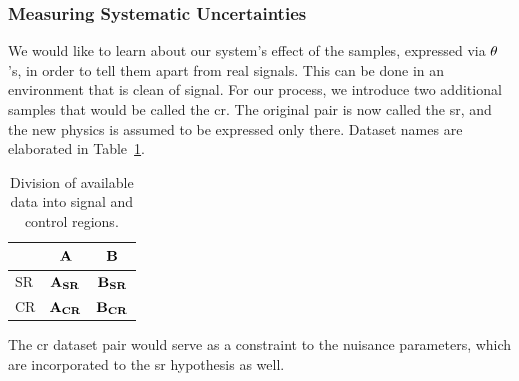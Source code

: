 \documentclass[paper/ddppaper2.tex]{subfiles}
\begin{document}
\subsubsection{Measuring Systematic Uncertainties}

We would like to learn about our system's effect of the samples, expressed via ${\theta}$'s, in order to tell them apart from real signals. This can be done in an environment that is clean of signal. For our process, we introduce two additional samples that would be called the \gls{cr}. The original pair is now called the \gls{sr}, and the new physics is assumed to be expressed only there. Dataset names are elaborated in Table~\ref{table:division_of_data}.

\begin{table}[ht]%
\centering
\caption{Division of available data into signal and control regions.\label{table:division_of_data}}
\begin{ruledtabular}
\begin{tabular}{lcc}
 & ${\mathbf{A}}$ & ${\mathbf{B}}$ \\
\hline
SR & ${\mathbf{A_{SR}}}$ & ${\mathbf{B_{SR}}}$ \\
CR & ${\mathbf{A_{CR}}}$ & ${\mathbf{B_{CR}}}$ \\
\end{tabular}
\end{ruledtabular}
\end{table}

The \gls{cr} dataset pair would serve as a constraint to the nuisance parameters, which are incorporated to the \gls{sr} hypothesis as well.
\end{document}
